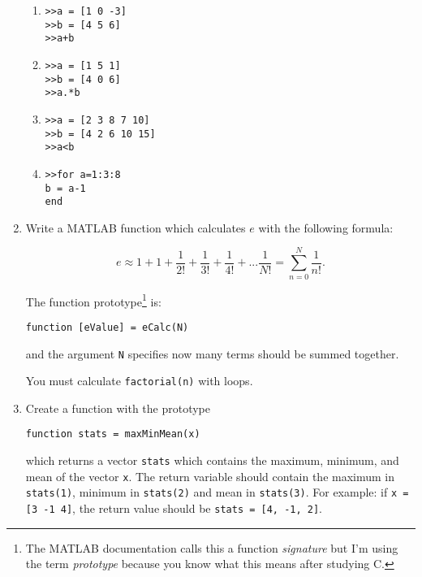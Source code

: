 \documentclass{lab}
\begin{document}
\begin{enumerate}
\begin{enumerate}
\item \texttt{>>a = [1 0 -3]}\\
\texttt{>>b = [4 5 6]}\\
\texttt{>>a+b}

\item \texttt{>>a = [1 5 1]}\\
\texttt{>>b = [4 0 6]}\\
\texttt{>>a.*b}

\item \texttt{>>a = [2 3 8 7 10]} \\
\texttt{>>b = [4 2 6 10 15]} \\
\texttt{>>a<b}

\item \texttt{>>for a=1:3:8\\
b = a-1\\
end}
	\end{enumerate}

\item Write a MATLAB function which calculates $e$ with the following formula:

\begin{equation}
e \approx 1 + 1 + \frac{1}{2!} + \frac{1}{3!} + \frac{1}{4!} + ... \frac{1}{N!} = \sum_{n=0}^N \frac{1}{n!}.
\end{equation}

The function prototype\footnote{The MATLAB documentation calls this a function \textit{signature} but I'm using the term \textit{prototype} because you know what this means after studying C.} is:

\begin{lstlisting}[style=pseudo]
function [eValue] = eCalc(N)
\end{lstlisting}

and the argument \texttt{N} specifies now many terms should be summed together.

You must calculate \texttt{factorial(n)} with loops.

\item Create a function with the prototype

\texttt{function stats = maxMinMean(x)}

which returns a vector \texttt{stats} which contains the maximum, minimum, and mean of the vector \texttt{x}. The return variable should contain the maximum in \texttt{stats(1)}, minimum in \texttt{stats(2)} and mean in \texttt{stats(3)}.
For example:
if \texttt{x = [3 -1 4]}, the return value should be \texttt{stats = [4, -1, 2]}.


\end{enumerate}
\end{document}

